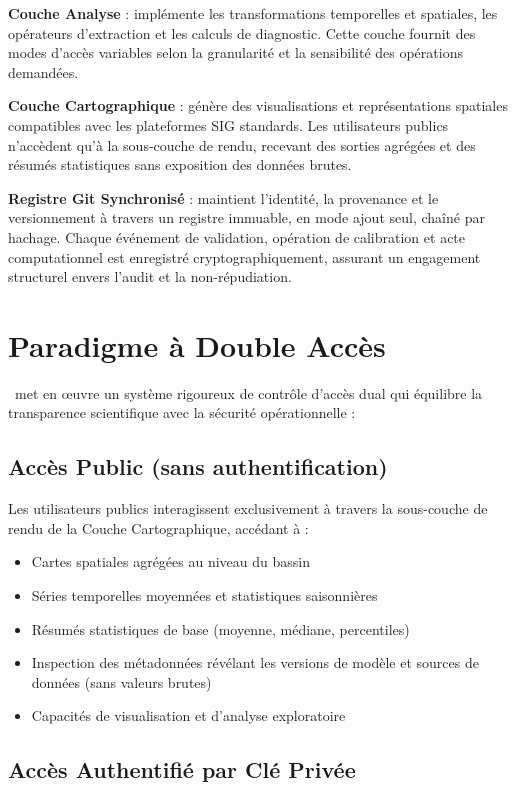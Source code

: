 \textbf{Couche Analyse} : implémente les transformations temporelles et spatiales, les opérateurs d'extraction et les calculs de diagnostic. Cette couche fournit des modes d'accès variables selon la granularité et la sensibilité des opérations demandées.

\textbf{Couche Cartographique} : génère des visualisations et représentations spatiales compatibles avec les plateformes SIG standards. Les utilisateurs publics n'accèdent qu'à la sous-couche de rendu, recevant des sorties agrégées et des résumés statistiques sans exposition des données brutes.

\textbf{Registre Git Synchronisé} : maintient l'identité, la provenance et le versionnement à travers un registre immuable, en mode ajout seul, chaîné par hachage. Chaque événement de validation, opération de calibration et acte computationnel est enregistré cryptographiquement, assurant un engagement structurel envers l'audit et la non-répudiation.

\section*{Paradigme à Double Accès}

\hydrot\ met en œuvre un système rigoureux de contrôle d'accès dual qui équilibre la transparence scientifique avec la sécurité opérationnelle :

\subsection*{Accès Public (sans authentification)}

Les utilisateurs publics interagissent exclusivement à travers la sous-couche de rendu de la Couche Cartographique, accédant à :
\begin{itemize}
\item Cartes spatiales agrégées au niveau du bassin
\item Séries temporelles moyennées et statistiques saisonnières
\item Résumés statistiques de base (moyenne, médiane, percentiles)
\item Inspection des métadonnées révélant les versions de modèle et sources de données (sans valeurs brutes)
\item Capacités de visualisation et d'analyse exploratoire
\end{itemize}

\subsection*{Accès Authentifié par Clé Privée}

